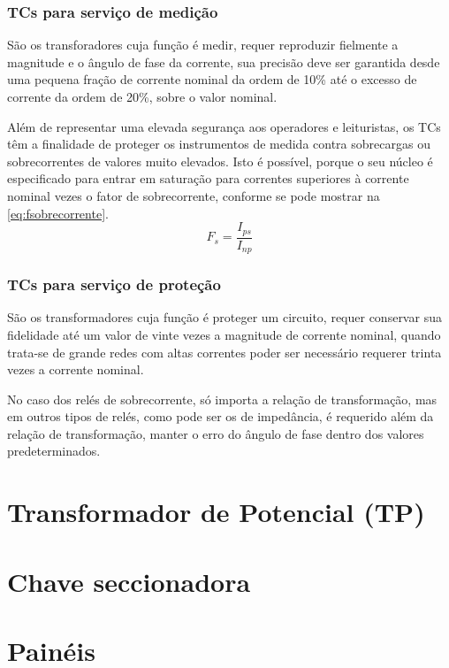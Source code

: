 			\subsubsection{TCs para serviço de medição}
				São os transforadores cuja função é medir, requer reproduzir fielmente a magnitude e o ângulo de fase da corrente, sua precisão deve ser garantida desde uma pequena fração de corrente nominal da ordem de 10\% até o excesso de corrente da ordem de 20\%, sobre o valor nominal.\cite{apuntesmeza}\par
				Além de representar uma elevada segurança aos operadores e leituristas, os TCs têm a finalidade de proteger os instrumentos de medida contra sobrecargas ou sobrecorrentes de valores muito elevados. Isto é possível, porque o seu núcleo é especificado para entrar em saturação para correntes superiores à corrente nominal vezes o fator de sobrecorrente, conforme se pode mostrar na \autoref{eq:fsobrecorrente}.
				\begin{equation} \label{eq:fsobrecorrente}
					F_{s} = \frac{I_{ps}}{I_{np}}
					\end{equation}

			\subsubsection{TCs para serviço de proteção}
				São os transformadores cuja função é proteger um circuito, requer conservar sua fidelidade até um valor de vinte vezes a magnitude de corrente nominal, quando trata-se de grande redes com altas correntes poder ser necessário requerer trinta vezes a corrente nominal.\par
				No caso dos relés de sobrecorrente, só importa a relação de transformação, mas em outros tipos de relés, como pode ser os de impedância, é requerido além da relação de transformação, manter o erro do ângulo de fase dentro dos valores predeterminados.\cite{apuntesmeza}\par

	\section{Transformador de Potencial (TP)}

	\section{Chave seccionadora}

	\section{Painéis}


